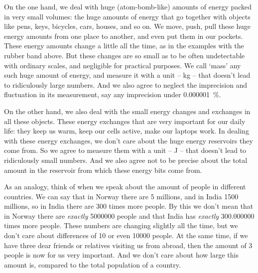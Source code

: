 \documentclass[a4paper,12pt,%
onecolumn,oneside,titlepage,%
british%
]{memoir}
\renewcommand*{\|}[1][]{\nonscript\:#1\vert\nonscript\:\mathopen{}}
\begin{document}
On the one hand, we deal with huge (atom-bomb-like) amounts of energy packed in very small volumes: the huge amounts of energy that go together with objects like pens, keys, bicycles, cars, houses, and so on. We move, push, pull these huge energy amounts from one place to another, and even put them in our pockets. These energy amounts change a little all the time, as in the examples with the rubber band above. But these changes are so small as to be often undetectable with ordinary scales, and negligible for practical purposes. We call \enquote*{mass} any such huge amount of energy, and measure it with a unit -- \unit{kg} -- that doesn't lead to ridiculously large numbers. And we also agree to neglect the imprecision and fluctuation in its measurement, say any imprecision under \qty{0.000001}{\percent}. %

On the other hand, we also deal with the small energy changes and exchanges in all these objects. These energy exchanges that are very important for our daily life: they keep us warm, keep our cells active, make our laptops work. In dealing with these energy exchanges, we don't care about the huge energy reservoirs they come from. So we agree to measure them with a unit -- \unit{J} -- that doesn't lead to ridiculously small numbers. And we also agree not to be precise about the total amount in the reservoir from which these energy bits come from.

As an analogy, think of when we speak about the amount of people in different countries. We can say that in Norway there are \num{5} millions, and in India \num{1500} millions, so in India there are \num{300} times more people. By this we don't mean that in Norway there are \emph{exactly} \num{5000000} people and that India has \emph{exactly} \num{300.000000} times more people. These numbers are changing slightly all the time, but we don't care about differences of 10 or even \num{10000} people. At the same time, if we have three dear friends or relatives visiting us from abroad, then the amount of \num{3} people is now for us very important. And we don't care about how large this amount is, compared to the total population of a country.
\end{document}
